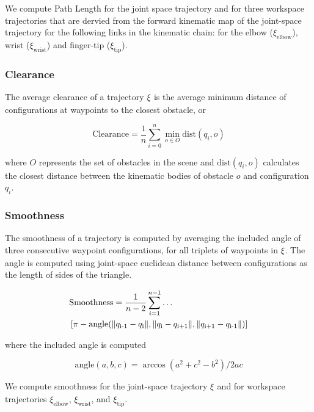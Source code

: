 \documentclass[letterpaper, 10 pt, conference]{ieeeconf}  %
\newcommand{\tj}[1]{\ensuremath{\xi_\text{#1}}}
\begin{document}
We compute Path Length for the joint space trajectory and for three workspace trajectories that are dervied from the forward kinematic map of the joint-space trajectory for the following links in the kinematic chain: for the elbow ($\xi_\text{elbow}$), wrist ($\xi_\text{wrist}$) and finger-tip ($\xi_\text{tip}$).

\subsubsection{Clearance}

The average clearance of a trajectory \tj{} is the average minimum distance of configurations at waypoints to the closest obstacle, or

\begin{equation}
\text{Clearance} = \frac{1}{n} \sum_{i=0}^n \min_{o \in O} \text{dist}(q_i, o)
\end{equation}

where $O$ represents the set of obstacles in the scene and $\text{dist}(q_i, o)$ calculates the closest distance between the kinematic bodies of obstacle $o$ and configuration $q_i$.

\subsubsection{Smoothness}

The smoothness of a trajectory is computed by averaging the included angle of three consecutive waypoint configurations, for all triplets of waypoints in \tj{}. The angle is computed using joint-space euclidean distance between configurations as the length of sides of the triangle.

\begin{equation}
\begin{aligned}
&\text{Smoothness} = \frac{1}{n-2} \sum_{i=1}^{n-1} \mathellipsis\\
&\left[ \pi- \text{angle}(\|q_\text{i-1}-q_\text{i}\|,\|q_\text{i}-q_\text{i+1}\|,\|q_\text{i+1}-q_\text{i-1}\|) \right]\\
\end{aligned}
\end{equation}

where the included angle is computed

\begin{equation}
\text{angle}(a,b,c) = \arccos (a^2+c^2-b^2)/2ac
\end{equation}

We compute smoothness for the joint-space trajectory \tj{} and for workspace trajectories $\xi_\text{elbow}$, $\xi_\text{wrist}$, and $\xi_\text{tip}$.
\end{document}
